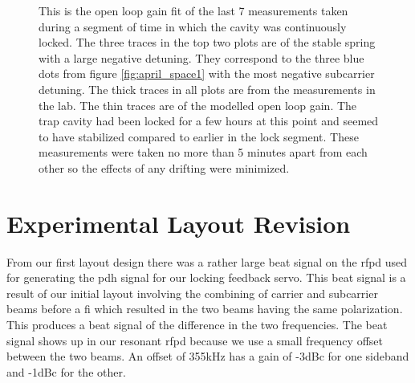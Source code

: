 \begin{figure}
    \caption[Data Fitting of Open Loop Gain for 1st Results]{This is the open
        loop gain fit of the last 7 measurements taken during a segment of
        time in which the cavity was continuously locked.
        The three traces in the top two plots are of the stable spring with
        a large negative detuning.
        They correspond to the three blue dots from figure
        \ref{fig:april_space1} with the most negative subcarrier detuning.
        The thick traces in all plots are from the measurements in the lab.
        The thin traces are of the modelled open loop gain.
        The trap cavity had been locked for a few hours at this point and
        seemed to have stabilized compared to earlier in the lock segment.
        These measurements were taken no more than 5 minutes apart from each
        other so the effects of any drifting were minimized.}
  \label{fig:aprilolg1}
\end{figure}


\section{Experimental Layout Revision}
\label{sec:expimps}
From our first layout design there was a rather
large beat signal on the \ac{rfpd} used for generating the \ac{pdh} signal
for our locking feedback servo.
This beat signal is a result of our initial layout involving the combining of
carrier and subcarrier beams before a \ac{fi} which resulted in the two beams
having the same polarization.
This produces a beat signal of the difference in the two frequencies.
The beat signal shows up in our resonant \ac{rfpd} because we use a small
frequency offset between the two beams. An offset of 355kHz has a gain of
-3dBc for one sideband and -1dBc for the other.

